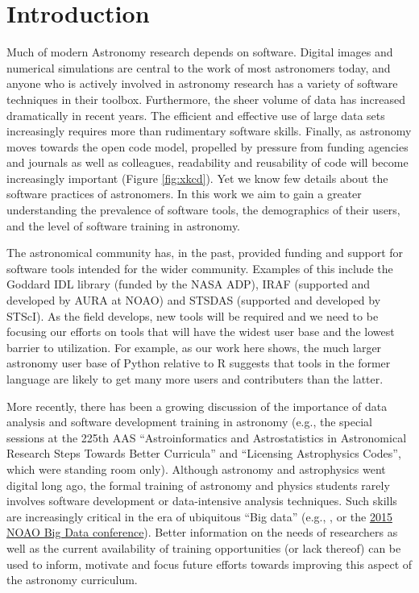 \section{Introduction}
\label{sec:intro}

Much of modern Astronomy research depends on software. Digital images and numerical simulations are central to the work of most astronomers today, and anyone who is actively involved in astronomy research has a variety of software techniques in their toolbox. Furthermore, the sheer volume of data has increased dramatically in recent years. The efficient and effective use of large data sets increasingly requires more than rudimentary software skills. Finally, as astronomy moves towards the open code model, propelled by pressure from funding agencies and journals as well as colleagues, readability and reusability of code will become increasingly important (Figure \ref{fig:xkcd}). Yet we know few details about the software practices of astronomers. In this work we aim to gain a greater understanding the prevalence of software tools, the demographics of their users, and the level of software training in astronomy.

The astronomical community has, in the past, provided funding and support for software tools intended for the wider community. Examples of this include the Goddard IDL library (funded by the NASA ADP), IRAF (supported and developed by AURA at NOAO) and STSDAS (supported and developed by STScI). As the field develops, new tools will be required and we need to be focusing our efforts on tools that will have the widest user base and the lowest barrier to utilization. For example, as our work here shows, the much larger astronomy user base of Python relative to R suggests that tools in the former language are likely to get many more users and contributers than the latter. 

More recently, there has been a growing discussion of the importance of data analysis and software development training in astronomy (e.g., the special sessions at the 225th AAS ``Astroinformatics and Astrostatistics in Astronomical Research Steps Towards Better Curricula'' and ``Licensing Astrophysics Codes'', which were standing room only). Although astronomy and astrophysics went digital long ago, the formal training of astronomy and physics students rarely involves software development or data-intensive analysis techniques. Such skills are increasingly critical in the era of ubiquitous ``Big data'' (e.g., \citet{Berriman_2011}, or the \href{http://www.noao.edu/meetings/bigdata/}{2015 NOAO Big Data conference}). Better information on the needs of researchers as well as the current availability of training opportunities (or lack thereof) can be used to inform, motivate and focus future efforts towards improving this aspect of the astronomy curriculum. 

